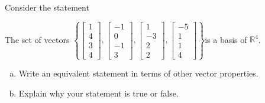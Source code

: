 
\begin{exerciseStatement}


Consider the statement 
\begin{center}\begin{minipage}{0.8\textwidth}
 The set of vectors \( \left\{ \left[\begin{array}{c}
1 \\
4 \\
3 \\
4
\end{array}\right] , \left[\begin{array}{c}
-1 \\
0 \\
-1 \\
3
\end{array}\right] , \left[\begin{array}{c}
1 \\
-3 \\
2 \\
2
\end{array}\right] , \left[\begin{array}{c}
-5 \\
1 \\
1 \\
4
\end{array}\right] \right\} \)is a basis of \(\mathbb{R}^4\). 
\end{minipage}\end{center}
    


\begin{enumerate}[(a)]
\item  Write an equivalent statement in terms of other vector properties.
\item  Explain why your statement is true or false.
\end{enumerate}
    
\end{exerciseStatement}
    
